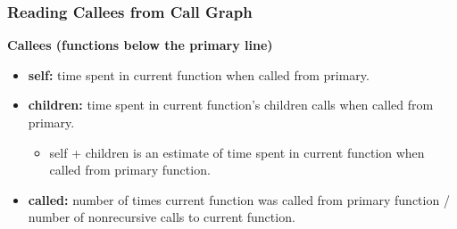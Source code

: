 \begin{frame}[fragile]
  \frametitle{Reading Callees from Call Graph}

\large
\begin{changemargin}{1.5cm}
  
  {\bf Callees (functions below the primary line)}
  \begin{itemize}  
    \item {\bf self:} time spent in current function when called from primary.
    \item {\bf children:} time spent in current function's children calls when
      called from primary.
      \begin{itemize}
        \item self + children is an estimate of time spent in current function
          when called from primary function.
      \end{itemize}
    \item {\bf called:} number of times current function was called from primary
      function / number of nonrecursive calls to current function.
  \end{itemize}
  \end{changemargin}
\end{frame}

